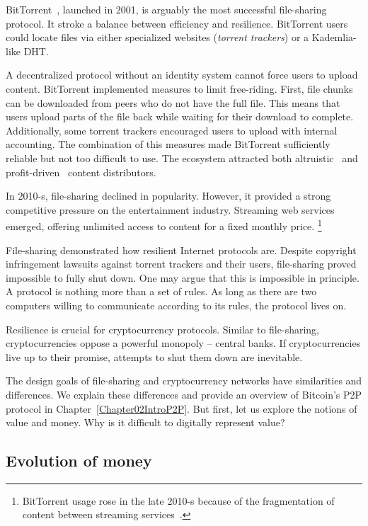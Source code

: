 BitTorrent~\cite{Pouwelse2005}, launched in 2001, is arguably the most successful file-sharing protocol.
It stroke a balance between efficiency and resilience.
BitTorrent users could locate files via either specialized websites (\textit{torrent trackers}) or a Kademlia-like DHT.

A decentralized protocol without an identity system cannot force users to upload content.
BitTorrent implemented measures to limit free-riding.
First, file chunks can be downloaded from peers who do not have the full file.
This means that users upload parts of the file back while waiting for their download to complete.
Additionally, some torrent trackers encouraged users to upload with internal accounting.
The combination of this measures made BitTorrent sufficiently reliable but not too difficult to use.
The ecosystem attracted both altruistic~\cite{Rehn2004} and profit-driven~\cite{Rumin2010} content distributors.

In 2010-s, file-sharing declined in popularity.
However, it provided a strong competitive pressure on the entertainment industry.
Streaming web services emerged, offering unlimited access to content for a fixed monthly price.
\footnote{BitTorrent usage rose in the late 2010-s because of the fragmentation of content between streaming services~\cite{Bode2018}.}

File-sharing demonstrated how resilient Internet protocols are.
Despite copyright infringement lawsuits against torrent trackers and their users, file-sharing proved impossible to fully shut down.
One may argue that this is impossible in principle.
A protocol is nothing more than a set of rules.
As long as there are two computers willing to communicate according to its rules, the protocol lives on.

Resilience is crucial for cryptocurrency protocols.
Similar to file-sharing, cryptocurrencies oppose a powerful monopoly -- central banks.
If cryptocurrencies live up to their promise, attempts to shut them down are inevitable.

The design goals of file-sharing and cryptocurrency networks have similarities and differences.
We explain these differences and provide an overview of Bitcoin's P2P protocol in Chapter~\ref{Chapter02IntroP2P}.
But first, let us explore the notions of value and money.
Why is it difficult to digitally represent value?



\subsection{Evolution of money}

